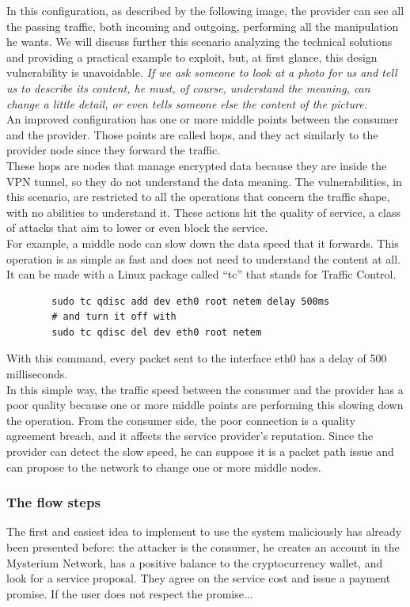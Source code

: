 \documentclass[]{article}
\begin{document}
	In this configuration, as described by the following image, the provider can see all the passing traffic, both incoming and outgoing, performing all the manipulation he wants. We will discuss further this scenario analyzing the technical solutions and providing a practical example to exploit, but, at first glance, this design vulnerability is unavoidable. \textit{If we ask someone to look at a photo for us and tell us to describe its content, he must, of course, understand the meaning, can change a little detail, or even tells someone else the content of the picture.}\\
	
	An improved configuration has one or more middle points between the consumer and the provider. Those points are called hops, and they act similarly to the provider node since they forward the traffic.\\
	These hops are nodes that manage encrypted data because they are inside the VPN tunnel, so they do not understand the data meaning. The vulnerabilities, in this scenario, are restricted to all the operations that concern the traffic shape, with no abilities to understand it. These actions hit the quality of service, a class of attacks that aim to lower or even block the service.\\
	For example, a middle node can slow down the data speed that it forwards. This operation is as simple as fast and does not need to understand the content at all. It can be made with a Linux package called ``tc'' \cite{tc} that stands for Traffic Control.\\

	\begin{verbatim}
		sudo tc qdisc add dev eth0 root netem delay 500ms
		# and turn it off with
		sudo tc qdisc del dev eth0 root netem
	\end{verbatim}

	With this command, every packet sent to the interface eth0 has a delay of 500 milliseconds.\\
	In this simple way, the traffic speed between the consumer and the provider has a poor quality because one or more middle points are performing this slowing down the operation. From the consumer side, the poor connection is a quality agreement breach, and it affects the service provider's reputation. Since the provider can detect the slow speed, he can suppose it is a packet path issue and can propose to the network to change one or more middle nodes. 

	\subsubsection{The flow steps}
	The first and easiest idea to implement to use the system maliciously has already been presented before: the attacker is the consumer, he creates an account in the Mysterium Network, has a positive balance to the cryptocurrency wallet, and look for a service proposal. They agree on the service cost and issue a payment promise. If the user does not respect the promise...
\end{document}
